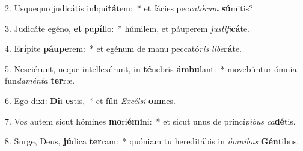 2. Usquequo judicátis in\textbf{i}qui\textbf{tá}tem:~*  et fácies pec\textit{ca}\textit{tó}\textit{rum} \textbf{sú}mitis?\

3. Judicáte egéno, \textbf{et} pu\textbf{píl}lo:~*  húmilem, et páuperem \textit{jus}\textit{ti}\textit{fi}\textbf{cá}te.\

4. E\textbf{rí}pite \textbf{páu}\textbf{pe}rem:~*  et egénum de manu peccató\textit{ris} \textit{li}\textit{be}\textbf{rá}te.\

5. Nesciérunt, neque intellexérunt, in \textbf{té}nebris \textbf{ám}\textbf{bu}lant:~*  movebúntur ómnia fun\textit{da}\textit{mén}\textit{ta} \textbf{ter}ræ.\

6. Ego dixi: \textbf{Di}i \textbf{es}tis,~*  et fílii \textit{Ex}\textit{cél}\textit{si} \textbf{om}nes.\

7. Vos autem sicut hómines \textbf{mo}ri\textbf{é}\textbf{mi}ni:~*  et sicut unus de princí\textit{pi}\textit{bus} \textit{ca}\textbf{dé}tis.\

8. Surge, Deus, \textbf{jú}dica \textbf{ter}ram:~*  quóniam tu hereditábis in \textit{óm}\textit{ni}\textit{bus} \textbf{Gén}tibus.\

